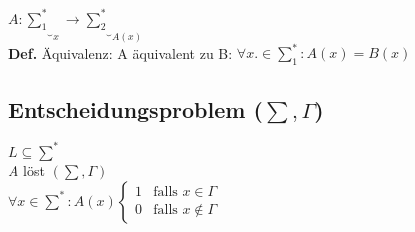\documentclass[a4paper,10pt]{article}
\begin{document}
$A:\underbrace{\textstyle{\sum_1^*}}_{x}\rightarrow\underbrace{\textstyle\sum_2^*}_{A(x)}$\\
\textbf{Def.} Äquivalenz: A äquivalent zu B: $\forall x .\in \sum_1^*: A(x)=B(x)$

\pagebreakcc
\subsection{Entscheidungsproblem ($\sum, \Gamma$)}
$L\subseteq\sum^*$\\[4pt]
\textit{A} löst $(\sum,\Gamma)$\\[4pt]
$\forall x \in \sum^*: A(x)
\begin{cases}
    1 & \text{falls } x \in \Gamma\\
    0 & \text{falls } x \notin \Gamma
\end{cases}$
\end{document}

